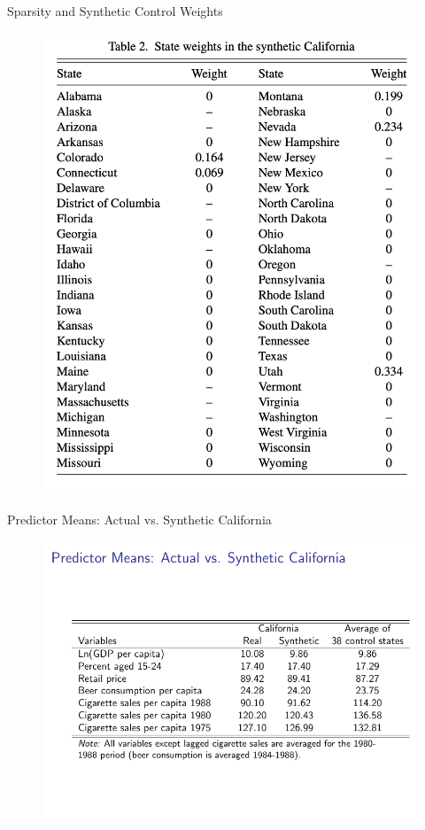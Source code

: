 \documentclass{beamer}
\begin{document}
\begin{frame}{Sparsity and Synthetic Control Weights}
	\begin{figure}
	\includegraphics[scale=0.25]{./lecture_includes/synth_smoking_table2.png}
	\end{figure}
\end{frame}



\begin{frame}{Predictor Means: Actual vs. Synthetic California}
	
	\begin{figure}
	\includegraphics[scale=0.75]{./lecture_includes/abadie_5.pdf}
	\end{figure}
\end{frame}
\end{document}
